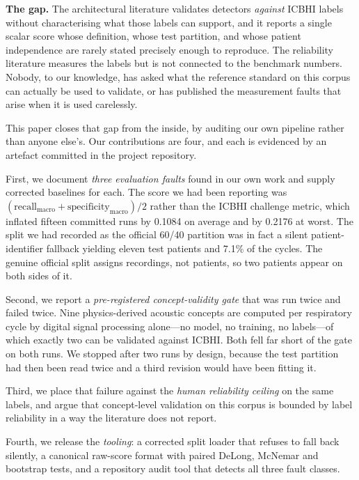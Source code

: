 \documentclass[journal,onecolumn]{IEEEtran}
\begin{document}
\textbf{The gap.} The architectural literature validates detectors \emph{against}
ICBHI labels without characterising what those labels can support, and it reports a
single scalar score whose definition, whose test partition, and whose patient
independence are rarely stated precisely enough to reproduce. The reliability
literature measures the labels but is not connected to the benchmark numbers. Nobody,
to our knowledge, has asked what the reference standard on this corpus can actually
be used to validate, or has published the measurement faults that arise when it is
used carelessly.

This paper closes that gap from the inside, by auditing our own pipeline rather than
anyone else's. Our contributions are four, and each is evidenced by an artefact
committed in the project repository.

First, we document \emph{three evaluation faults} found in our own work and supply
corrected baselines for each. The score we had been reporting was
$(\text{recall}_{\text{macro}} + \text{specificity}_{\text{macro}})/2$ rather than
the ICBHI challenge metric, which inflated fifteen committed runs by 0.1084 on
average and by 0.2176 at worst. The split we had recorded as the official 60/40
partition was in fact a silent patient-identifier fallback yielding eleven test
patients and 7.1\% of the cycles. The genuine official split assigns recordings, not
patients, so two patients appear on both sides of it.

Second, we report a \emph{pre-registered concept-validity gate} that was run twice and
failed twice. Nine physics-derived acoustic concepts are computed per respiratory
cycle by digital signal processing alone---no model, no training, no labels---of
which exactly two can be validated against ICBHI. Both fell far short of the gate on
both runs. We stopped after two runs by design, because the test partition had then
been read twice and a third revision would have been fitting it.

Third, we place that failure against the \emph{human reliability ceiling} on the same
labels, and argue that concept-level validation on this corpus is bounded by label
reliability in a way the literature does not report.

Fourth, we release the \emph{tooling}: a corrected split loader that refuses to fall
back silently, a canonical raw-score format with paired DeLong, McNemar and bootstrap
tests, and a repository audit tool that detects all three fault classes.
\end{document}
